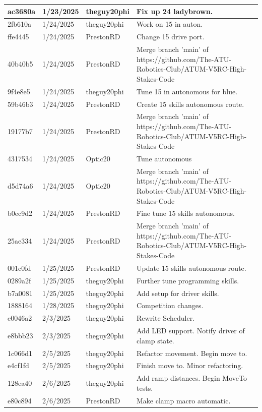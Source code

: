 \begin{center}
\begin{longtable}{|p{28pt}|p{33pt}|p{40pt}|p{300pt}|}
\hline
ac3680a & 1/23/2025 & theguy20phi & Fix up 24 ladybrown. \\
\hline
2fb610a & 1/24/2025 & theguy20phi & Work on 15 in auton. \\
\hline
ffe4445 & 1/24/2025 & PrestonRD & Change 15 drive port. \\
\hline
40b40b5 & 1/24/2025 & PrestonRD & Merge branch 'main' of https://github.com/The-ATU-Robotics-Club/ATUM-V5RC-High-Stakes-Code \\
\hline
9f4e8e5 & 1/24/2025 & theguy20phi & Tune 15 in autonomous for blue. \\
\hline
59b46b3 & 1/24/2025 & PrestonRD & Create 15 skills autonomous route. \\
\hline
19177b7 & 1/24/2025 & PrestonRD & Merge branch 'main' of https://github.com/The-ATU-Robotics-Club/ATUM-V5RC-High-Stakes-Code \\
\hline
4317534 & 1/24/2025 & Optic20 & Tune autonomous \\
\hline
d5d74a6 & 1/24/2025 & Optic20 & Merge branch 'main' of https://github.com/The-ATU-Robotics-Club/ATUM-V5RC-High-Stakes-Code \\
\hline
b0ec9d2 & 1/24/2025 & PrestonRD & Fine tune 15 skills autonomous. \\
\hline
25ae334 & 1/24/2025 & PrestonRD & Merge branch 'main' of https://github.com/The-ATU-Robotics-Club/ATUM-V5RC-High-Stakes-Code \\
\hline
001c0fd & 1/25/2025 & PrestonRD & Update 15 skills autonomous route. \\
\hline
0289a2f & 1/25/2025 & theguy20phi & Further tune programming skills. \\
\hline
b7a0081 & 1/25/2025 & theguy20phi & Add setup for driver skills. \\
\hline
1888164 & 1/28/2025 & theguy20phi & Competition changes. \\
\hline
e0046a2 & 2/3/2025 & theguy20phi & Rewrite Scheduler. \\
\hline
e8bbb23 & 2/3/2025 & theguy20phi & Add LED support. Notify driver of clamp state. \\
\hline
1c066d1 & 2/5/2025 & theguy20phi & Refactor movement. Begin move to. \\
\hline
e4cf1fd & 2/5/2025 & theguy20phi & Finish move to. Minor refactoring. \\
\hline
128ea40 & 2/6/2025 & theguy20phi & Add ramp distances. Begin MoveTo tests. \\
\hline
e80c894 & 2/6/2025 & PrestonRD & Make clamp macro automatic. \\

\end{longtable}
\end{center}
